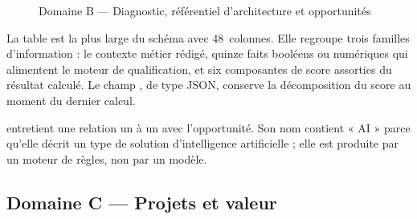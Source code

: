 \begin{figure}[H]
\caption{Domaine B — Diagnostic, référentiel d'architecture et opportunités}
\label{fig:classes-diagnostic}
\end{figure}

La table  est la plus large du schéma avec 48~colonnes. Elle regroupe
trois familles d'information : le contexte métier rédigé, quinze faits booléens ou
numériques qui alimentent le moteur de qualification, et six composantes de score
assorties du résultat calculé. Le champ , de type JSON,
conserve la décomposition du score au moment du dernier calcul.

 entretient une relation un à un avec l'opportunité. Son nom
contient « AI » parce qu'elle décrit un type de solution d'intelligence artificielle ;
elle est produite par un moteur de règles, non par un modèle.

\subsection{Domaine C — Projets et valeur}

